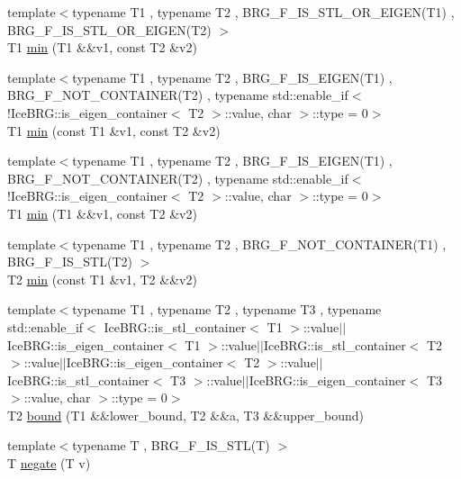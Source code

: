 \begin{DoxyCompactItemize}
\item 
{\footnotesize template$<$typename T1 , typename T2 , B\-R\-G\-\_\-\-F\-\_\-\-I\-S\-\_\-\-S\-T\-L\-\_\-\-O\-R\-\_\-\-E\-I\-G\-E\-N(\-T1) , B\-R\-G\-\_\-\-F\-\_\-\-I\-S\-\_\-\-S\-T\-L\-\_\-\-O\-R\-\_\-\-E\-I\-G\-E\-N(\-T2) $>$ }\\T1 \hyperlink{namespaceIceBRG_a18c1da312ebca1c790a1cadc488e5ef0}{min} (T1 \&\&v1, const T2 \&v2)
\item 
{\footnotesize template$<$typename T1 , typename T2 , B\-R\-G\-\_\-\-F\-\_\-\-I\-S\-\_\-\-E\-I\-G\-E\-N(\-T1) , B\-R\-G\-\_\-\-F\-\_\-\-N\-O\-T\-\_\-\-C\-O\-N\-T\-A\-I\-N\-E\-R(\-T2) , typename std\-::enable\-\_\-if$<$!\-Ice\-B\-R\-G\-::is\-\_\-eigen\-\_\-container$<$ T2 $>$\-::value, char $>$\-::type  = 0$>$ }\\T1 \hyperlink{namespaceIceBRG_a5aeeb131d380c8e7fa1e0ad902a0b235}{min} (const T1 \&v1, const T2 \&v2)
\item 
{\footnotesize template$<$typename T1 , typename T2 , B\-R\-G\-\_\-\-F\-\_\-\-I\-S\-\_\-\-E\-I\-G\-E\-N(\-T1) , B\-R\-G\-\_\-\-F\-\_\-\-N\-O\-T\-\_\-\-C\-O\-N\-T\-A\-I\-N\-E\-R(\-T2) , typename std\-::enable\-\_\-if$<$!\-Ice\-B\-R\-G\-::is\-\_\-eigen\-\_\-container$<$ T2 $>$\-::value, char $>$\-::type  = 0$>$ }\\T1 \hyperlink{namespaceIceBRG_aa02603bb006552a228cc8bb4c025d69c}{min} (T1 \&\&v1, const T2 \&v2)
\item 
{\footnotesize template$<$typename T1 , typename T2 , B\-R\-G\-\_\-\-F\-\_\-\-N\-O\-T\-\_\-\-C\-O\-N\-T\-A\-I\-N\-E\-R(\-T1) , B\-R\-G\-\_\-\-F\-\_\-\-I\-S\-\_\-\-S\-T\-L(\-T2) $>$ }\\T2 \hyperlink{namespaceIceBRG_af73f1aa40a37b83ae2ba115e8c46d4ac}{min} (const T1 \&v1, T2 \&\&v2)
\item 
{\footnotesize template$<$typename T1 , typename T2 , typename T3 , typename std\-::enable\-\_\-if$<$ Ice\-B\-R\-G\-::is\-\_\-stl\-\_\-container$<$ T1 $>$\-::value$|$$|$\-Ice\-B\-R\-G\-::is\-\_\-eigen\-\_\-container$<$ T1 $>$\-::value$|$$|$\-Ice\-B\-R\-G\-::is\-\_\-stl\-\_\-container$<$ T2 $>$\-::value$|$$|$\-Ice\-B\-R\-G\-::is\-\_\-eigen\-\_\-container$<$ T2 $>$\-::value$|$$|$\-Ice\-B\-R\-G\-::is\-\_\-stl\-\_\-container$<$ T3 $>$\-::value$|$$|$\-Ice\-B\-R\-G\-::is\-\_\-eigen\-\_\-container$<$ T3 $>$\-::value, char $>$\-::type  = 0$>$ }\\T2 \hyperlink{namespaceIceBRG_afb9d707ea1f160da7f32d1005ccff199}{bound} (T1 \&\&lower\-\_\-bound, T2 \&\&a, T3 \&\&upper\-\_\-bound)
\item 
{\footnotesize template$<$typename T , B\-R\-G\-\_\-\-F\-\_\-\-I\-S\-\_\-\-S\-T\-L(\-T) $>$ }\\T \hyperlink{namespaceIceBRG_a840c2bf73d4fe2f99006a0057b58e709}{negate} (T v)

\end{DoxyCompactItemize}
